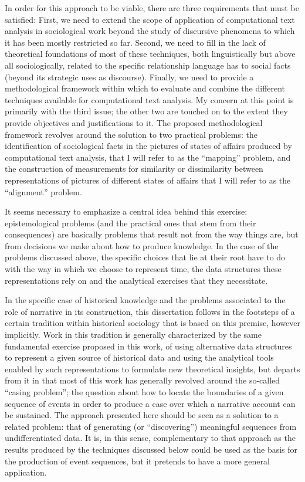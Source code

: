 In order for this approach to be viable, there are three requirements that must be satisfied:
First, we need to extend the scope of application of computational text analysis in sociological work beyond the study of discursive phenomena to which it has been mostly restricted so far.
Second, we need to fill in the lack of theoretical foundations of most of these techniques, both linguistically but above all sociologically, related to the specific relationship language has to social facts (beyond its strategic uses as discourse).
Finally, we need to provide a methodological framework within which to evaluate and combine the different techniques available for computational text analysis.
My concern at this point is primarily with the third issue; the other two are touched on to the extent they provide objectives and justifications to it.
The proposed methodological framework revolves around the solution to two practical problems: the identification of sociological facts in the pictures of states of affairs produced by computational text analysis, that I will refer to as the ``mapping'' problem, and the construction of measurements for similarity or dissimilarity between representations of pictures of different states of affairs that I will refer to as the ``alignment'' problem.

It seems necessary to emphasize a central idea behind this exercise: epistemological problems (and the practical ones that stem from their consequences) are basically problems that result not from the way things are, but from decisions we make about how to produce knowledge.
In the case of the problems discussed above, the specific choices that lie at their root have to do with the way in which we choose to represent time, the data structures these representations rely on and the analytical exercises that they necessitate.

In the specific case of historical knowledge and the problems associated to the role of narrative in its construction, this dissertation follows in the footsteps of a certain tradition within historical sociology that is based on this premise, however implicitly.
Work in this tradition is generally characterized by the same fundamental exercise proposed in this work, of using alternative data structures to represent a given source of historical data and using the analytical tools enabled by such representations to formulate new theoretical insights, but departs from it in that most of this work has generally revolved around the so-called ``casing problem''; the question about how to locate the boundaries of a given sequence of events in order to produce a case over which a narrative account can be sustained.
The approach presented here should be seen as a solution to a related problem: that of generating (or ``discovering'') meaningful sequences from undifferentiated data.
It is, in this sense, complementary to that approach as the results produced by the techniques discussed below could be used as the basis for the production of event sequences, but it pretends to have a more general application.

